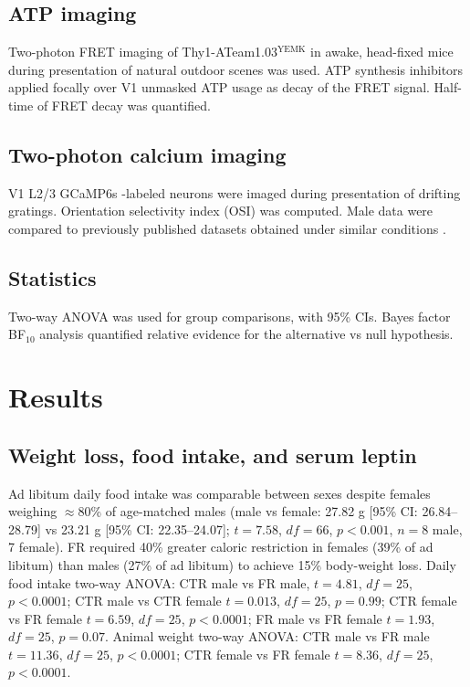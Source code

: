 \documentclass[11pt]{article}
\begin{document}
\subsection{ATP imaging}
Two-photon FRET imaging of Thy1-ATeam1.03$^{\mathrm{YEMK}}$ \cite{imamura2009visualization,yoshida2019development} in awake, head-fixed mice during presentation of natural outdoor scenes was used. ATP synthesis inhibitors applied focally over V1 unmasked ATP usage as decay of the FRET signal. Half-time of FRET decay was quantified.

\subsection{Two-photon calcium imaging}
V1 L2/3 GCaMP6s \cite{chen2013ultrasensitive}-labeled neurons were imaged during presentation of drifting gratings. Orientation selectivity index (OSI) was computed. Male data were compared to previously published datasets obtained under similar conditions \cite{padamsey2022neocortex}.

\subsection{Statistics}
Two-way ANOVA was used for group comparisons, with 95\% CIs. Bayes factor BF$_{10}$ analysis \cite{kass1995bayes,morey2015baws} quantified relative evidence for the alternative vs null hypothesis.

\section{Results}
\subsection{Weight loss, food intake, and serum leptin}
Ad libitum daily food intake was comparable between sexes despite females weighing $\approx$80\% of age-matched males (male vs female: 27.82 g [95\% CI: 26.84--28.79] vs 23.21 g [95\% CI: 22.35--24.07]; $t = 7.58$, $df = 66$, $p < 0.001$, $n = 8$ male, 7 female). FR required 40\% greater caloric restriction in females (39\% of ad libitum) than males (27\% of ad libitum) to achieve 15\% body-weight loss. Daily food intake two-way ANOVA: CTR male vs FR male, $t = 4.81$, $df = 25$, $p < 0.0001$; CTR male vs CTR female $t = 0.013$, $df = 25$, $p = 0.99$; CTR female vs FR female $t = 6.59$, $df = 25$, $p < 0.0001$; FR male vs FR female $t = 1.93$, $df = 25$, $p = 0.07$. Animal weight two-way ANOVA: CTR male vs FR male $t = 11.36$, $df = 25$, $p < 0.0001$; CTR female vs FR female $t = 8.36$, $df = 25$, $p < 0.0001$.
\end{document}
